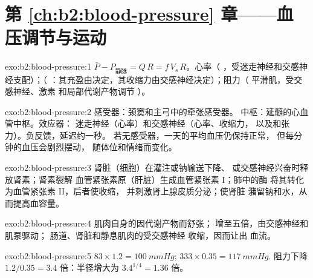 \section*{第 \ref{ch:b2:blood-pressure} 章——血压调节与运动}

\begin{solution}{exo:b2:blood-pressure:1}
$\bar P - P_{\text{静脉}} = Q\,R = f\,V_s\,R$。心率（
，受迷走神经和交感神经支配）；（
：其充盈由决定，其收缩力由交感神经决定）；阻力（
平滑肌，受交感神经、激素
和局部代谢产物调节
）。
\end{solution}

\begin{solution}{exo:b2:blood-pressure:2}
感受器：颈窦和主弓中的牵张感受器。
中枢：延髓的心血管中枢。效应器：
迷走神经（心率）和交感神经（心率、收缩力，
以及和张力）。负反馈，延迟约一秒。
若无感受器，一天的平均血压仍保持正常，
但每分钟的血压会剧烈摆动，
随体位和情绪而变化。
\end{solution}

\begin{solution}{exo:b2:blood-pressure:3}
肾脏（细胞）在灌注或钠输送下降、
或交感神经兴奋时释放肾素；肾素裂解
血管紧张素原（肝脏）生成血管紧张素 I；肺中的酶
将其转化为血管紧张素 II，后者使收缩，
并刺激肾上腺皮质分泌；使肾脏
潴留钠和水，从而提高血容量。
\end{solution}

\begin{solution}{exo:b2:blood-pressure:4}
肌肉自身的因代谢产物而舒张；
增至五倍，由交感神经和肌泵驱动；
肠道、肾脏和静息肌肉的受交感神经
收缩，因而让出
血流。
\end{solution}

\begin{solution}{exo:b2:blood-pressure:5}
$83\times 1.2 = \qty{100}{mmHg}$; $333\times 0.35 = \qty{117}{mmHg}$.
阻力下降 $1.2/0.35 = 3.4$ 倍：半径增大为 $3.4^{1/4} =
1.36$ 倍。
\end{solution}

